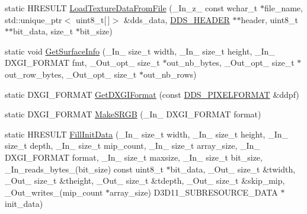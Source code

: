 \begin{DoxyCompactItemize}
\item 
static H\+R\+E\+S\+U\+LT \hyperlink{namespacemage_ad1df9b8a27dd30528717777fd0c9c3db}{Load\+Texture\+Data\+From\+File} (\+\_\+\+In\+\_\+z\+\_\+ const wchar\+\_\+t $\ast$file\+\_\+name, std\+::unique\+\_\+ptr$<$ uint8\+\_\+t\mbox{[}$\,$\mbox{]}$>$ \&dds\+\_\+data, \hyperlink{structmage_1_1_d_d_s___h_e_a_d_e_r}{D\+D\+S\+\_\+\+H\+E\+A\+D\+ER} $\ast$$\ast$header, uint8\+\_\+t $\ast$$\ast$bit\+\_\+data, size\+\_\+t $\ast$bit\+\_\+size)
\item 
static void \hyperlink{namespacemage_a7b67bb6f38f3e787fb3561d236b88bd2}{Get\+Surface\+Info} (\+\_\+\+In\+\_\+ size\+\_\+t width, \+\_\+\+In\+\_\+ size\+\_\+t height, \+\_\+\+In\+\_\+ D\+X\+G\+I\+\_\+\+F\+O\+R\+M\+AT fmt, \+\_\+\+Out\+\_\+opt\+\_\+ size\+\_\+t $\ast$out\+\_\+nb\+\_\+bytes, \+\_\+\+Out\+\_\+opt\+\_\+ size\+\_\+t $\ast$out\+\_\+row\+\_\+bytes, \+\_\+\+Out\+\_\+opt\+\_\+ size\+\_\+t $\ast$out\+\_\+nb\+\_\+rows)
\item 
static D\+X\+G\+I\+\_\+\+F\+O\+R\+M\+AT \hyperlink{namespacemage_a4fecf9823aec7c5ba078acf6bd73f983}{Get\+D\+X\+G\+I\+Format} (const \hyperlink{structmage_1_1_d_d_s___p_i_x_e_l_f_o_r_m_a_t}{D\+D\+S\+\_\+\+P\+I\+X\+E\+L\+F\+O\+R\+M\+AT} \&ddpf)
\item 
static D\+X\+G\+I\+\_\+\+F\+O\+R\+M\+AT \hyperlink{namespacemage_a35ccdb42bbc027d3678b849fb962f3d3}{Make\+S\+R\+GB} (\+\_\+\+In\+\_\+ D\+X\+G\+I\+\_\+\+F\+O\+R\+M\+AT format)
\item 
static H\+R\+E\+S\+U\+LT \hyperlink{namespacemage_ac20162a68be6828c38072a3afb0711c1}{Fill\+Init\+Data} (\+\_\+\+In\+\_\+ size\+\_\+t width, \+\_\+\+In\+\_\+ size\+\_\+t height, \+\_\+\+In\+\_\+ size\+\_\+t depth, \+\_\+\+In\+\_\+ size\+\_\+t mip\+\_\+count, \+\_\+\+In\+\_\+ size\+\_\+t array\+\_\+size, \+\_\+\+In\+\_\+ D\+X\+G\+I\+\_\+\+F\+O\+R\+M\+AT format, \+\_\+\+In\+\_\+ size\+\_\+t maxsize, \+\_\+\+In\+\_\+ size\+\_\+t bit\+\_\+size, \+\_\+\+In\+\_\+reads\+\_\+bytes\+\_\+(bit\+\_\+size) const uint8\+\_\+t $\ast$bit\+\_\+data, \+\_\+\+Out\+\_\+ size\+\_\+t \&twidth, \+\_\+\+Out\+\_\+ size\+\_\+t \&theight, \+\_\+\+Out\+\_\+ size\+\_\+t \&tdepth, \+\_\+\+Out\+\_\+ size\+\_\+t \&skip\+\_\+mip, \+\_\+\+Out\+\_\+writes\+\_\+(mip\+\_\+count $\ast$array\+\_\+size) D3\+D11\+\_\+\+S\+U\+B\+R\+E\+S\+O\+U\+R\+C\+E\+\_\+\+D\+A\+TA $\ast$init\+\_\+data)
\item 

\end{DoxyCompactItemize}
